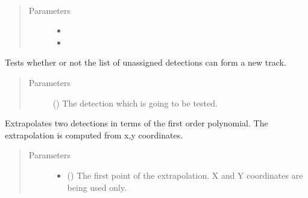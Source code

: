 \documentclass[letterpaper,10pt,english]{Reference manual}
\begin{document}
\begin{fulllineitems}
\label{\detokenize{datacontainers:data_containers.UnAssignedDetectionList}}~\begin{quote}\begin{description}
\item[{Parameters}] \leavevmode\begin{itemize}
\item {} 
 \textendash{} 

\item {} 
 \textendash{} 

\end{itemize}

\end{description}\end{quote}

\begin{fulllineitems}
\label{\detokenize{datacontainers:data_containers.UnAssignedDetectionList.new_detection}}
Tests whether or not the list of unassigned detections can form a new track.
\begin{quote}\begin{description}
\item[{Parameters}] \leavevmode
{} ({\hyperref[\detokenize{datacontainers:data_containers.DetectionPoint}]{}}) \textendash{} The detection which is going to be tested.

\end{description}\end{quote}

\end{fulllineitems}


\begin{fulllineitems}
\label{\detokenize{datacontainers:data_containers.UnAssignedDetectionList.two_point_projection}}
Extrapolates two detections in terms of the first order polynomial.
The extrapolation is computed from x,y coordinates.
\begin{quote}\begin{description}
\item[{Parameters}] \leavevmode\begin{itemize}
\item {} 
 ({\hyperref[\detokenize{datacontainers:data_containers.DetectionPoint}]{}}) \textendash{} The first point of the extrapolation. X and Y coordinates are being used only.


\end{itemize}
\end{description}
\end{quote}
\end{fulllineitems}
\end{fulllineitems}
\end{document}
